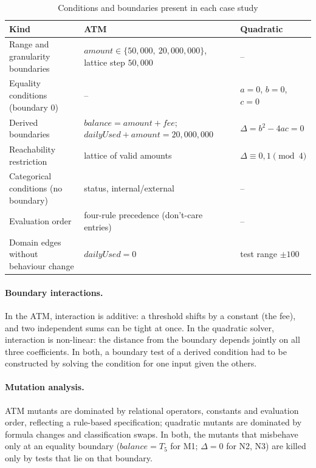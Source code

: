 \documentclass[11pt,a4paper]{article}
\begin{document}
\begin{table}[H]
\centering
\caption{Conditions and boundaries present in each case study}
\label{tab:boundary-types}
\small
\begin{tabularx}{\textwidth}{L{4cm} Y Y}
\toprule
Kind & ATM & Quadratic \\
\midrule
Range and granularity boundaries & \(\mathit{amount}\in\{50{,}000,\ 20{,}000{,}000\}\), lattice step \(50{,}000\) & -- \\
Equality conditions (boundary \(0\)) & -- & \(a=0\), \(b=0\), \(c=0\) \\
Derived boundaries & \(\mathit{balance}=\mathit{amount}+\mathit{fee}\); \(\mathit{dailyUsed}+\mathit{amount}=20{,}000{,}000\) & \(\Delta=b^2-4ac=0\) \\
Reachability restriction & lattice of valid amounts & \(\Delta\equiv0,1\pmod4\) \\
Categorical conditions (no boundary) & status, internal/external & -- \\
Evaluation order & four-rule precedence (don't-care entries) & -- \\
Domain edges without behaviour change & \(\mathit{dailyUsed}=0\) & test range \(\pm100\) \\
\bottomrule
\end{tabularx}
\end{table}

\paragraph{Boundary interactions.} In the ATM, interaction is additive: a
threshold shifts by a constant (the fee), and two independent sums can be
tight at once. In the quadratic solver, interaction is non-linear: the
distance from the boundary depends jointly on all three coefficients. In
both, a boundary test of a derived condition had to be constructed by solving
the condition for one input given the others.

\paragraph{Mutation analysis.} ATM mutants are dominated by relational
operators, constants and evaluation order, reflecting a rule-based
specification; quadratic mutants are dominated by formula changes and
classification swaps. In both, the mutants that misbehave only at an
equality boundary (\(\mathit{balance}=T_5\) for M1; \(\Delta=0\) for N2, N3)
are killed only by tests that lie on that boundary.
\end{document}
